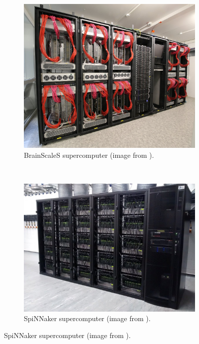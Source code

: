 \begin{figure}[!ht]
    \centering
    \begin{subfigure}[b]{0.47\textwidth}
        \includegraphics[width=\textwidth]{figures/brainscales.jpg}
        \caption{BrainScaleS supercomputer (image from \cite{nmp}).}
        \label{fig:brainscales}
    \end{subfigure}%
    ~
    \begin{subfigure}[b]{0.53\textwidth}
        \includegraphics[width=\textwidth]{figures/spinnaker106.jpg}
        \caption{SpiNNaker supercomputer (image from \cite{nmp}).}
        \label{fig:spinnaker106}
    \end{subfigure}
\end{figure} 

